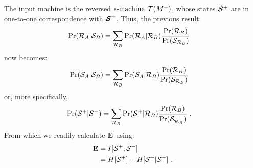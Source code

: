 The input machine is the reversed $\mbox{$\epsilon$-machine}$ $\mathcal{T}({M}^{+})$, whose states
$\widetilde{\boldsymbol{\mathcal{S}}}{}^+$ are in one-to-one correspondence with
${\boldsymbol{\mathcal{S}}}^{+}$. Thus, the previous result:
\begin{align*}
\Pr(\mathcal{R}_A | \mathcal{S}_B)
  &= \sum_{\mathcal{R}_B}
  {\Pr(\mathcal{R}_A | \mathcal{R}_B)
  \frac{\Pr(\mathcal{R}_B)}{\Pr(\mathcal{S}_{\mathcal{R}_B})}}
\end{align*}
now becomes:
\begin{align*}
\Pr(\mathcal{S}_A | \mathcal{S}_B)
  &= \sum_{\mathcal{R}_B}{\Pr(\mathcal{S}_A | \mathcal{R}_B)
  \frac{\Pr(\mathcal{R}_B)}{\Pr(\mathcal{S}_{\mathcal{R}_B})}}
\end{align*}
or, more specifically,
\begin{align*}
\Pr({\mathcal{S}}^{+} | {\mathcal{S}}^{-})
  &= \sum_{\mathcal{R}_B}
  	\Pr({\mathcal{S}}^{+} | \mathcal{R}_B)
	\frac{\Pr(\mathcal{R}_B)}
	{\Pr({\mathcal{S}}^{-}_{\mathcal{R}_B})} ~.
\end{align*}
From which we readily calculate ${\bf E}$ using:
\begin{align*}
{\bf E} &= I[{\mathcal{S}}^{+}; {\mathcal{S}}^{-}] \\
    &= H[{\mathcal{S}}^{+}] - H[{\mathcal{S}}^{+} | {\mathcal{S}}^{-}] ~.
\end{align*}




